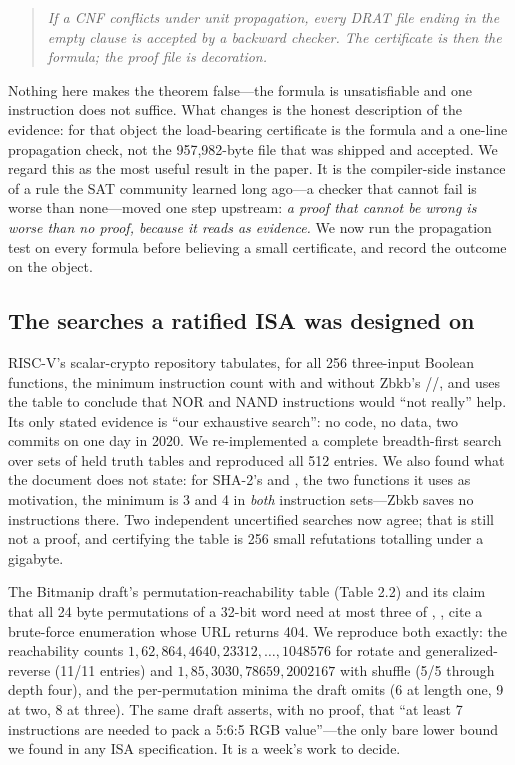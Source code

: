 \begin{quote}
\emph{If a CNF conflicts under unit propagation, every DRAT file ending in the empty clause is accepted by a backward checker. The certificate is then the formula; the proof file is decoration.}
\end{quote}

Nothing here makes the theorem false---the formula is unsatisfiable and one instruction does not suffice. What changes is the honest description of the evidence: for that object the load-bearing certificate is the formula and a one-line propagation check, not the 957,982-byte file that was shipped and accepted. We regard this as the most useful result in the paper. It is the compiler-side instance of a rule the SAT community learned long ago---a checker that cannot fail is worse than none---moved one step upstream: \emph{a proof that cannot be wrong is worse than no proof, because it reads as evidence.} We now run the propagation test on every formula before believing a small certificate, and record the outcome on the object.

\subsection{The searches a ratified ISA was designed on}
\label{sec:isa}

RISC-V's scalar-crypto repository tabulates, for all 256 three-input Boolean functions, the minimum instruction count with and without Zbkb's //, and uses the table to conclude that NOR and NAND instructions would \enquote{not really} help. Its only stated evidence is \enquote{our exhaustive search}: no code, no data, two commits on one day in 2020. We re-implemented a complete breadth-first search over sets of held truth tables and reproduced all 512 entries. We also found what the document does not state: for SHA-2's  and , the two functions it uses as motivation, the minimum is 3 and 4 in \emph{both} instruction sets---Zbkb saves no instructions there. Two independent uncertified searches now agree; that is still not a proof, and certifying the table is 256 small refutations totalling under a gigabyte.

The Bitmanip draft's permutation-reachability table (Table 2.2) and its claim that all 24 byte permutations of a 32-bit word need at most three of , ,  cite a brute-force enumeration whose URL returns 404. We reproduce both exactly: the reachability counts $1, 62, 864, 4640, 23312, \dots, 1048576$ for rotate and generalized-reverse (11/11 entries) and $1, 85, 3030, 78659, 2002167$ with shuffle (5/5 through depth four), and the per-permutation minima the draft omits (6 at length one, 9 at two, 8 at three). The same draft asserts, with no proof, that \enquote{at least 7 instructions are needed to pack a 5:6:5 RGB value}---the only bare lower bound we found in any ISA specification. It is a week's work to decide.

